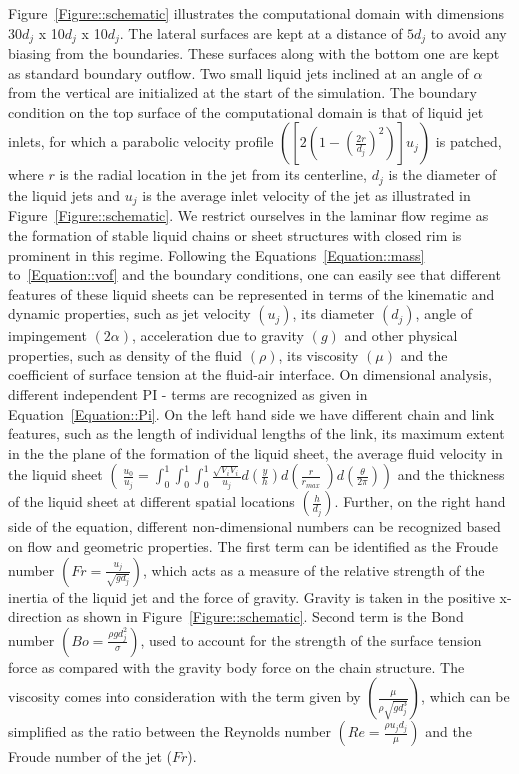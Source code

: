 \documentclass[%
aip,
sd,%
amsmath,amssymb,
preprint,%
author-year,%
]{revtex4-1}
\begin{document}
Figure~\ref{Figure::schematic} illustrates the computational domain with dimensions 30$d_j$ x 10$d_j$ x 10$d_j$. The lateral surfaces are kept at a distance of $5d_j$ to avoid any biasing from the boundaries. These surfaces along with the bottom one are kept as standard boundary outflow. Two small liquid jets inclined at an angle of $\alpha$ from the vertical are initialized at the start of the simulation. The boundary condition on the top surface of the computational domain is that of liquid jet inlets, for which a parabolic velocity profile $\left(\left[2\left(1 - \left(\frac{2r}{d_j}\right)^2\right) \right]u_j\right)$ is patched, where $r$ is the radial location in the jet from its centerline, $d_j$ is the diameter of the liquid jets and $u_j$ is the average inlet velocity of the jet as illustrated in Figure~\ref{Figure::schematic}. We restrict ourselves in the laminar flow regime as the formation of stable liquid chains or sheet structures with closed rim is prominent in this regime. Following the Equations~\ref{Equation::mass} to~\ref{Equation::vof} and the boundary conditions, one can easily see that different features of these liquid sheets can be represented in terms of the kinematic and dynamic properties, such as jet velocity $\left(u_j\right)$, its diameter $\left(d_j\right)$, angle of impingement $\left(2\alpha\right)$, acceleration due to gravity $\left(g\right)$ and other physical properties, such as density of the fluid $\left(\rho\right)$, its viscosity $\left(\mu\right)$ and the coefficient of surface tension at the fluid-air interface. On dimensional analysis, different independent PI - terms are recognized as given in Equation~\ref{Equation::Pi}. On the left hand side we have different chain and link features, such as the length of individual lengths of the link, its maximum extent in the the plane of the formation of the liquid sheet, the average fluid velocity in the liquid sheet $\left(\:\frac{u_0}{u_j} = \int_{0}^{1}\int_{0}^{1}\int_{0}^{1}\frac{\sqrt{V_iV_i}}{u_j}d\left(\frac{y}{h}\right)d\left(\frac{r}{r_{max}}\:\right)d\left(\frac{\theta}{2\pi}\right) \right)$ and the thickness of the liquid sheet at different spatial locations $\left(\frac{h}{d_j}\right)$. Further, on the right hand side of the equation, different non-dimensional numbers can be recognized based on flow and geometric properties. The first term can be identified as the Froude number $\left(Fr = \frac{u_j}{\sqrt{gd_j}}\right)$, which acts as a measure of the relative strength of the inertia of the liquid jet and the force of gravity. Gravity is taken in the positive x-direction as shown in Figure~\ref{Figure::schematic}. Second term is the Bond number $\left(Bo = \frac{\rho gd_j^2}{\sigma}\right)$, used to account for the strength of the surface tension force as compared with the gravity body force on the chain structure. The viscosity comes into consideration with the term given by $\left(\frac{\mu}{\rho\sqrt{gd_j^3}}\right)$, which can be simplified as the ratio between the Reynolds number $\left(Re = \frac{\rho u_jd_j}{\mu}\right)$ and the Froude number of the jet ($Fr$).
\end{document}
